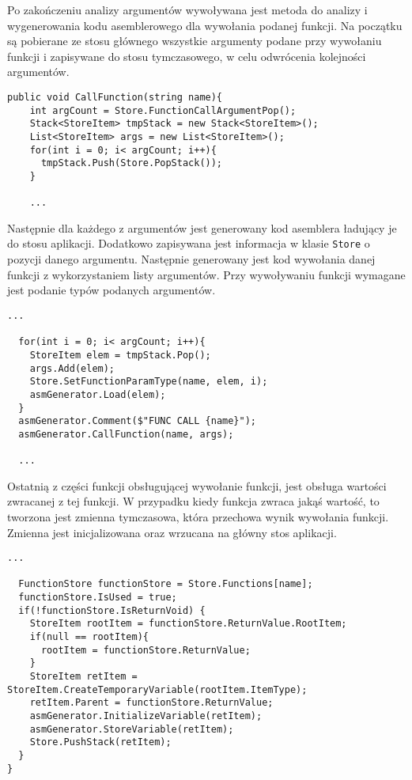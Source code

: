 \par Po zakończeniu analizy argumentów wywoływana jest metoda do analizy i wygenerowania kodu asemblerowego dla wywołania podanej funkcji. Na początku są pobierane ze stosu głównego wszystkie argumenty podane przy wywołaniu funkcji i zapisywane do stosu tymczasowego, w celu odwrócenia kolejności argumentów. 

\begin{lstlisting}[language=CSharp, caption={Implementacja funkcji obsługującej wywołanie funkcji cz.1}, label=alg:cs]
  public void CallFunction(string name){
    int argCount = Store.FunctionCallArgumentPop();
    Stack<StoreItem> tmpStack = new Stack<StoreItem>();
    List<StoreItem> args = new List<StoreItem>();
    for(int i = 0; i< argCount; i++){
      tmpStack.Push(Store.PopStack());
    }

    ...
\end{lstlisting}

\par Następnie dla każdego z argumentów jest generowany kod asemblera ładujący je do stosu aplikacji. Dodatkowo zapisywana jest informacja w klasie \texttt{Store} o pozycji danego argumentu. Następnie generowany jest kod wywołania danej funkcji z wykorzystaniem listy argumentów. Przy wywoływaniu funkcji wymagane jest podanie typów podanych argumentów.

\begin{lstlisting}[language=CSharp, caption={Implementacja funkcji obsługującej wywołanie funkcji cz.2}, label=alg:cs]
  ...

  for(int i = 0; i< argCount; i++){
    StoreItem elem = tmpStack.Pop();
    args.Add(elem);
    Store.SetFunctionParamType(name, elem, i);
    asmGenerator.Load(elem);
  }
  asmGenerator.Comment($"FUNC CALL {name}");
  asmGenerator.CallFunction(name, args);

  ...
\end{lstlisting}

\par Ostatnią z części funkcji obsługującej wywołanie funkcji, jest obsługa wartości zwracanej z tej funkcji. W przypadku kiedy funkcja zwraca jakąś wartość, to tworzona jest zmienna tymczasowa, która przechowa wynik wywołania funkcji. Zmienna jest inicjalizowana oraz wrzucana na główny stos aplikacji.

\begin{lstlisting}[language=CSharp, caption={Implementacja funkcji obsługującej wywołanie funkcji cz.3}, label=alg:cs]
  ...

  FunctionStore functionStore = Store.Functions[name];
  functionStore.IsUsed = true;
  if(!functionStore.IsReturnVoid) {
    StoreItem rootItem = functionStore.ReturnValue.RootItem;
    if(null == rootItem){
      rootItem = functionStore.ReturnValue;
    }
    StoreItem retItem = StoreItem.CreateTemporaryVariable(rootItem.ItemType);
    retItem.Parent = functionStore.ReturnValue;
    asmGenerator.InitializeVariable(retItem);
    asmGenerator.StoreVariable(retItem);
    Store.PushStack(retItem);
  }
}
\end{lstlisting}

